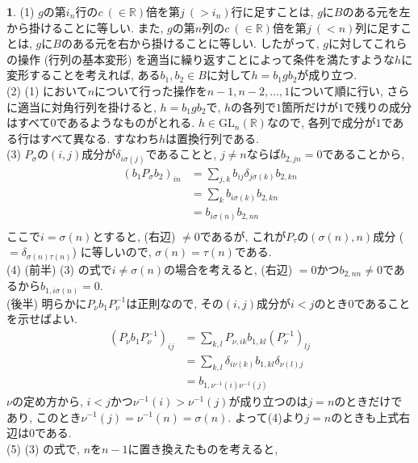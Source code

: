 \documentclass{article}
\theoremstyle{definition}
\newtheorem{ans}{}
\numberwithin{ans}{subsection}
\begin{document}
\begin{ans}
  (1) $g$の第$i_n$行の$c\ (\in \mathbb{R})$倍を第$j\ (> i_n)$行に足すことは, $g$に$B$のある元を左から掛けることに等しい.
  また, $g$の第$n$列の$c\ (\in \mathbb{R})$倍を第$j\ (< n)$列に足すことは, $g$に$B$のある元を右から掛けることに等しい.
  したがって, $g$に対してこれらの操作 (行列の基本変形) を適当に繰り返すことによって条件を満たすような$h$に変形することを考えれば,
  ある$b_1, b_2 \in B$に対して$h = b_1gb_2$が成り立つ.\\
  (2) (1) において$n$について行った操作を$n-1, n-2,..., 1$について順に行い, さらに適当に対角行列を掛けると,
  $h = b_1gb_2$で, $h$の各列で$1$箇所だけが$1$で残りの成分はすべて$0$であるようなものがとれる.
  $h \in \mathrm{GL}_n(\mathbb{R})$なので, 各列で成分が$1$である行はすべて異なる.
  すなわち$h$は置換行列である.\\
  (3) $P_\sigma$の$(i, j)$成分が$\delta_{i\sigma(j)}$であることと,
  $j \neq n$ならば$b_{2, jn} = 0$であることから,
  \begin{align*}
    (b_1 P_\sigma b_2)_{in} &= \sum_{j, k}b_{ij}\delta_{j\sigma(k)}b_{2, kn} \\
    &= \sum_kb_{i\sigma(k)}b_{2, kn} \\
    &= b_{i\sigma(n)}b_{2, nn} \\
  \end{align*}
  ここで$i = \sigma(n)$とすると, (右辺) $\neq 0$であるが,
  これが$P_\tau$の$(\sigma(n), n)$成分 ($= \delta_{\sigma(n)\tau(n)}$) に等しいので,
  $\sigma(n) = \tau(n)$である.\\
  (4) (前半) (3) の式で$i \neq \sigma(n)$の場合を考えると,
  (右辺) $= 0$かつ$b_{2, nn} \neq 0$であるから$b_{1, i\sigma(n)} = 0$.\\
  (後半) 明らかに$P_\nu b_1 P_\nu^{-1}$は正則なので,
  その$(i, j)$成分が$i < j$のとき$0$であることを示せばよい.
  \begin{align*}
    (P_\nu b_1 P_\nu^{-1})_{ij} &= \sum_{k, l}P_{\nu, ik}b_{1, kl}(P_\nu^{-1})_{lj} \\
    &= \sum_{k, l}\delta_{i\nu(k)}b_{1, kl}\delta_{\nu(l)j} \\
    &= b_{1, \nu^{-1}(i)\nu^{-1}(j)}
  \end{align*}
  $\nu$の定め方から, $i < j$かつ$\nu^{-1}(i) > \nu^{-1}(j)$が成り立つのは$j = n$のときだけであり,
  このとき$\nu^{-1}(j) = \nu^{-1}(n) = \sigma(n)$.
  よって(4)より$j = n$のときも上式右辺は$0$である.\\
  (5) (3) の式で, $n$を$n-1$に置き換えたものを考えると,
  \begin{align*}

\end{align*}
\end{ans}
\end{document}

